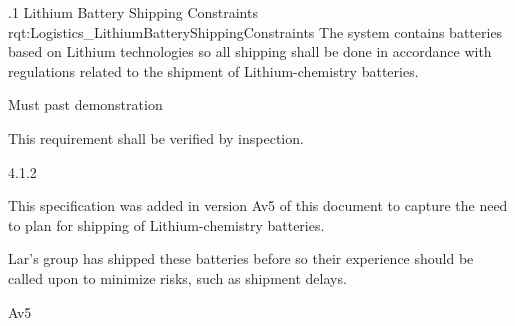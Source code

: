\ONERQMTV
{\RqtNumberBase.1}
{Lithium Battery Shipping Constraints}
{rqt:Logistics_LithiumBatteryShippingConstraints}
{The system contains batteries based on Lithium technologies so all shipping shall be done in accordance with regulations related to the shipment of Lithium-chemistry batteries.}
{
	\item [Phase 1] Must past demonstration
}
{This requirement shall be verified by inspection.}
{
	\item [\TBD] 4.1.2
}
{
	\item This specification was added in version Av5 of this document to capture the need to plan for shipping of Lithium-chemistry batteries.
	\item Lar's group has shipped these batteries before so their experience should be called upon to minimize risks, such as shipment delays.
}
{Av5}

